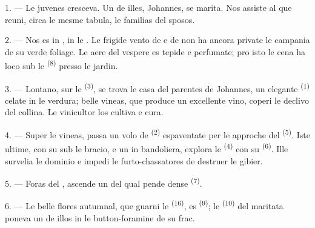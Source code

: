 
\VUsaut{4.0mm}
\VUsaut{1.6mm}
\VUsaut{3.2mm}

\VUsaut{1.6mm}
\VUsaut{2.6mm}

\VUsaut{3.0mm}

1. --- Le juvenes cresceva. Un de illes, Johannes, se marita. Nos assiste al
 que reuni, circa le mesme tabula, le familias del
sposos.

2. --- Nos es in , in le . Le frigide
vento de  e de  non ha ancora private le
campania de su verde foliage. Le aere del vespere es tepide e perfumate; pro
isto le cena ha loco sub le  \textsuperscript{(8)} presso le
jardin.

3. --- Lontano, sur le  \textsuperscript{(3)}, se trova le casa
del parentes de Johannes, un elegante  \textsuperscript{(1)}
celate in le verdura; belle vineas, que produce un excellente vino, coperi le
declivo del collina. Le vinicultor los cultiva e cura.

4. --- Super le vineas, passa un volo de  \textsuperscript{(2)}
espaventate per le approche del  \textsuperscript{(5)}.
Iste ultime, con su  sub le bracio, e un 
in bandoliera, explora le  \textsuperscript{(4)} con su
 \textsuperscript{(6)}. Ille survelia le dominio e impedi le
furto-chassatores de destruer le gibier.

5. --- Foras del , ascende un  del qual
pende dense  \textsuperscript{(7)}.

6. --- Le belle flores autumnal, que guarni le 
\textsuperscript{(16)}, es  \textsuperscript{(9)}; le
 \textsuperscript{(10)} del maritata poneva un de illos in le
button-foramine de su frac.

